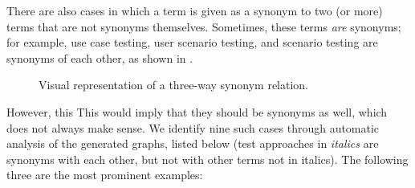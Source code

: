 \label{multiSyns}
There are also cases in which a term is given as a synonym to two (or more)
terms that are not synonyms themselves. \ifnotpaper Sometimes, these terms
    \emph{are} synonyms; for example, use case testing, user scenario testing,
    and scenario testing are synonyms of each other, as shown in
    .
    \begin{figure}[hbtp!]
        \centering
        \caption{Visual representation of a three-way synonym relation.}
        \label{fig:threeWaySyns}
    \end{figure}
    However, this \else This would imply that they should be synonyms as
    well, which \fi does not always make sense. We identify nine
such cases through automatic analysis of the generated graphs\ifnotpaper,
listed below (test approaches in \emph{italics} are synonyms with each other,
but not with other terms not in italics)\else. The following three are the most prominent examples\fi:

\ifnotpaper\else\fi

\begin{enumerate}
    
\end{enumerate}


